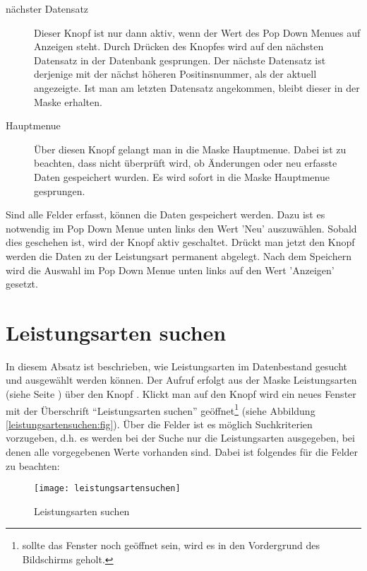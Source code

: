 \begin{description}
\item[nächster Datensatz] Dieser Knopf ist nur dann aktiv, wenn der Wert
des Pop Down Menues auf Anzeigen steht. Durch Drücken des Knopfes wird auf
den nächsten Datensatz in der Datenbank gesprungen. Der nächste Datensatz
ist derjenige mit der nächst höheren Positinsnummer, 
als der aktuell angezeigte. Ist
man am letzten Datensatz angekommen, bleibt dieser in der Maske erhalten.
\item[Hauptmenue] Über diesen Knopf gelangt man in die Maske Hauptmenue.
Dabei ist zu beachten, dass nicht überprüft wird, ob Änderungen oder neu
erfasste Daten gespeichert wurden. Es wird sofort in die Maske Hauptmenue
gesprungen.
\end{description}

Sind alle Felder erfasst, können die Daten gespeichert werden. Dazu ist
es notwendig im Pop Down Menue unten links den Wert 'Neu' auszuwählen.
Sobald dies geschehen ist, wird der Knopf  aktiv 
geschaltet. Drückt man jetzt den Knopf  werden die Daten
zu der Leistungsart permanent abgelegt. Nach dem Speichern wird die Auswahl im 
Pop Down Menue unten links auf den Wert 'Anzeigen' gesetzt.


\section{Leistungsarten suchen\label{leistungsartensuchen:abs}}
In diesem Absatz ist beschrieben, wie Leistungsarten im Datenbestand 
gesucht und ausgewählt werden können. Der  Aufruf erfolgt aus der 
Maske Leistungsarten (siehe Seite \pageref{leistungsarten:fig}) 
über den Knopf . 
Klickt man auf den Knopf  wird ein neues Fenster mit der
Überschrift ``Leistungsarten suchen'' geöffnet\footnote{sollte das Fenster 
noch geöffnet sein, wird es in den Vordergrund des Bildschirms geholt.} 
(siehe Abbildung \vref{leistungsartensuchen:fig}). Über die Felder  ist es möglich 
Suchkriterien vorzugeben, d.h. es werden bei der Suche nur die Leistungsarten
ausgegeben, bei denen alle vorgegebenen Werte vorhanden sind. Dabei ist
folgendes für die Felder zu beachten:

\begin{figure}[ht]
\centering
\texttt{[image: leistungsartensuchen]}
\caption{Leistungsarten suchen\label{leistungsartensuchen:fig}}
\end{figure}


